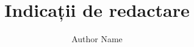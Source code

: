 \documentclass[a4paper,11pt]{scrreprt}                       %
\def \chapters {./chapters}      														 %
\begin{document}

\title{Indicații de redactare}														%
\author{Author Name}																				%

\maketitle


\tableofcontents 
\printnoidxglossaries																				%
\listoffigures 
{}
\listoftables
{}
\listofalgorithmes

\clearpage






\cite{garey1979computers}

\appendix
\appendixpage
\addappheadtotoc
\begin{appendices}																				  %


\end{appendices}

\cleardoublepage

\printbibliography[heading=bibintoc]
\end{document}
